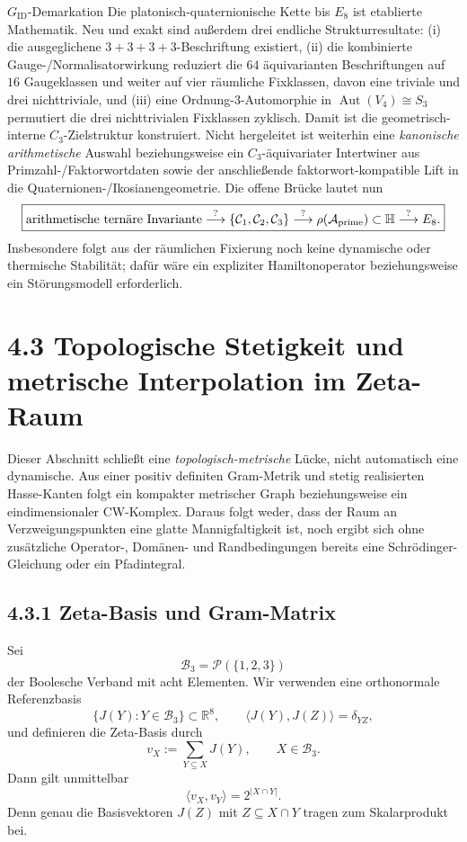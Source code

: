 \documentclass[11pt,a4paper]{article}
\begin{document}
\begin{statusbox}{$G_{\mathrm{ID}}$-Demarkation}
Die platonisch-quaternionische Kette bis $E_8$ ist etablierte Mathematik. Neu und exakt sind außerdem drei endliche Strukturresultate: (i) die ausgeglichene $3+3+3+3$-Beschriftung existiert, (ii) die kombinierte Gauge-/Normalisatorwirkung reduziert die $64$ äquivarianten Beschriftungen auf $16$ Gaugeklassen und weiter auf vier räumliche Fixklassen, davon eine triviale und drei nichttriviale, und (iii) eine Ordnung-$3$-Automorphie in $\operatorname{Aut}(V_4)\cong S_3$ permutiert die drei nichttrivialen Fixklassen zyklisch. Damit ist die geometrisch-interne $C_3$-Zielstruktur konstruiert. Nicht hergeleitet ist weiterhin eine \emph{kanonische arithmetische} Auswahl beziehungsweise ein $C_3$-äquivariater Intertwiner aus Primzahl-/Faktorwortdaten sowie der anschließende faktorwort-kompatible Lift in die Quaternionen-/Ikosianengeometrie. Die offene Brücke lautet nun
\[
\boxed{
\text{arithmetische ternäre Invariante}
\stackrel{?}{\longrightarrow}
\{\mathcal C_1,\mathcal C_2,\mathcal C_3\}
\stackrel{?}{\longrightarrow}
\rho(\mathcal A_{\rm prime})\subset\mathbb H
\stackrel{?}{\longrightarrow}
E_8.}
\]
Insbesondere folgt aus der räumlichen Fixierung noch keine dynamische oder thermische Stabilität; dafür wäre ein expliziter Hamiltonoperator beziehungsweise ein Störungsmodell erforderlich.
\end{statusbox}


\newpage
\section*{4.3 Topologische Stetigkeit und metrische Interpolation im Zeta-Raum}

\begin{warningbox}
Dieser Abschnitt schließt eine \emph{topologisch-metrische} Lücke, nicht automatisch eine dynamische. Aus einer positiv definiten Gram-Metrik und stetig realisierten Hasse-Kanten folgt ein kompakter metrischer Graph beziehungsweise ein eindimensionaler CW-Komplex. Daraus folgt weder, dass der Raum an Verzweigungspunkten eine glatte Mannigfaltigkeit ist, noch ergibt sich ohne zusätzliche Operator-, Domänen- und Randbedingungen bereits eine Schrödinger-Gleichung oder ein Pfadintegral.
\end{warningbox}

\subsection*{4.3.1 Zeta-Basis und Gram-Matrix}
Sei
\[
\mathcal B_3=\mathcal P(\{1,2,3\})
\]
der Boolesche Verband mit acht Elementen. Wir verwenden eine orthonormale Referenzbasis
\[
\{J(Y):Y\in\mathcal B_3\}\subset\mathbb R^8,
\qquad
\langle J(Y),J(Z)\rangle=\delta_{YZ},
\]
und definieren die Zeta-Basis durch
\[
v_X:=\sum_{Y\subseteq X}J(Y),\qquad X\in\mathcal B_3.
\]
Dann gilt unmittelbar
\[
\boxed{\langle v_X,v_Y\rangle=2^{|X\cap Y|}.}
\]
Denn genau die Basisvektoren $J(Z)$ mit $Z\subseteq X\cap Y$ tragen zum Skalarprodukt bei.
\end{document}
